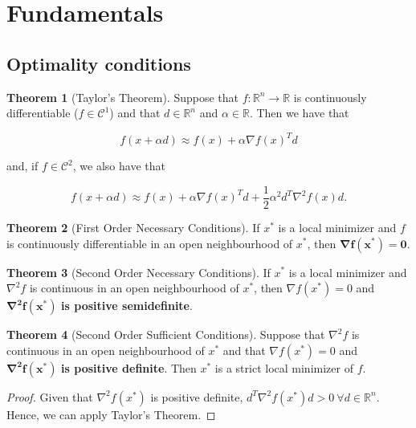 \documentclass[a4paper, 10pt, twocolumn]{article}
\theoremstyle{definition}
\newtheorem{theorem}{Theorem}
\theoremstyle{remark}
\newcommand{\al}{\alpha}
\newcommand{\R}{\mathbb{R}}
\newcommand{\C}{\mathcal{C}}
\begin{document}
\setlength{\abovedisplayskip}{0pt}
\setlength{\belowdisplayskip}{5pt}



\section{Fundamentals}


\subsection{Optimality conditions}

\begin{theorem}[Taylor's Theorem]
Suppose that $f : \R^n \rightarrow \R$ is continuously differentiable ($f \in \C^1$) and that $d \in \R^n$ and $\al \in \R$. Then we have that

$$
f(x+\al d) \approx f(x) + \al\nabla f(x)^Td
$$

and, if $f \in \C^2$, we also have that

$$
f(x+\al d) \approx f(x) + \al\nabla f(x)^Td + \frac{1}{2}\al^2d^T\nabla^2f(x)d.
$$
\end{theorem}

\begin{theorem} [First Order Necessary Conditions]
If $x^*$ is a local minimizer and $f$ is continuously differentiable in an open neighbourhood of $x^*$, then $\mathbf{\nabla f(x^*) = 0}$.
\end{theorem}

\begin{theorem} [Second Order Necessary Conditions]
If $x^*$ is a local minimizer and $\nabla^2f$ is continuous in an open neighbourhood of $x^*$, then $\nabla f(x^*) = 0$ and $\mathbf{\nabla^2f(x^*)}$ \textbf{is positive semidefinite}.
\end{theorem}

\begin{theorem}[Second Order Sufficient Conditions]
Suppose that $\nabla^2f$ is continuous in an open neighbourhood of $x^*$ and that $\nabla f(x^*) = 0$ and $\mathbf{\nabla^2f(x^*)}$ \textbf{is positive definite}. Then $x^*$ is a strict local minimizer of $f$.

\begin{proof}
Given that $\nabla^2f(x^*)$ is positive definite, $d^T\nabla^2f(x^*)d > 0 \ \forall d \in \R^n$. Hence, we can apply Taylor's Theorem.
\end{proof}

\end{theorem}
\end{document}
